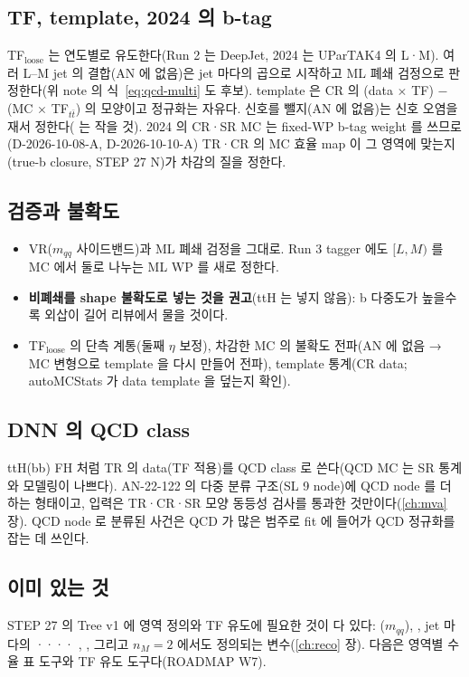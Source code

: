 \subsection{TF, template, 2024 의 b-tag}
TF$_{\text{loose}}$ 는 연도별로 유도한다(Run 2 는 DeepJet, 2024 는 UParTAK4 의 L·M). 여러 L–M jet 의 결합(AN 에 없음)은 jet 마다의 곱으로 시작하고 ML
폐쇄 검정으로 판정한다(위 note 의 식~\eqref{eq:qcd-multi} 도 후보). template 은 CR 의 (data $\times$ TF) $-$ (MC $\times$ TF$_{t\bar t}$) 의 모양이고 정규화는
자유다. 신호를 뺄지(AN 에 없음)는 신호 오염을 재서 정한다(\ttHH{} 는 작을 것). 2024 의 CR·SR MC 는 fixed-WP b-tag weight 를 쓰므로(D-2026-10-08-A,
D-2026-10-10-A) TR·CR 의 MC 효율 map 이 그 영역에 맞는지(true-b closure, STEP 27 N)가 차감의 질을 정한다.

\subsection{검증과 불확도}
\begin{itemize}
\item VR($m_{qq}$ 사이드밴드)과 ML 폐쇄 검정을 그대로. Run 3 tagger 에도 $[L,M)$ 를 \ttbar{} MC 에서 둘로 나누는 ML WP 를 새로 정한다.
\item \textbf{비폐쇄를 shape 불확도로 넣는 것을 권고}(ttH 는 넣지 않음): b 다중도가 높을수록 외삽이 길어 리뷰에서 물을 것이다.
\item TF$_{\text{loose}}$ 의 단측 계통(둘째 $\eta$ 보정), 차감한 MC 의 불확도 전파(AN 에 없음 → MC 변형으로 template 을 다시 만들어 전파), template 통계(CR data;
      autoMCStats 가 data template 을 덮는지 확인).
\end{itemize}

\subsection{DNN 의 QCD class}
ttH(bb) FH 처럼 TR 의 data(TF 적용)를 QCD class 로 쓴다(QCD MC 는 SR 통계와 모델링이 나쁘다). AN-22-122 의 다중 분류 구조(SL 9 node)에 QCD node 를 더하는
형태이고, 입력은 TR·CR·SR 모양 동등성 검사를 통과한 것만이다(\ref{ch:mva} 장). QCD node 로 분류된 사건은
QCD 가 많은 범주로 fit 에 들어가 QCD 정규화를 잡는 데 쓰인다.

\subsection{이미 있는 것\,\tagimpl}
STEP 27 의 Tree v1 에 영역 정의와 TF 유도에 필요한 것이 다 있다: ($m_{qq}$), , jet 마다의 ····
, , 그리고 $n_M=2$ 에서도 정의되는 \chisq{} 변수(\ref{ch:reco} 장). 다음은 영역별 수율 표 도구와
TF 유도 도구다(ROADMAP W7).

